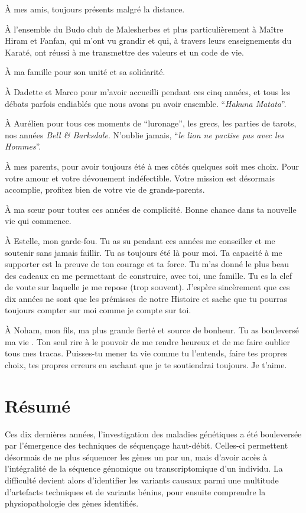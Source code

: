 \documentclass[12pt,a4paper,twoside]{ugathesis}
\theoremstyle{definition}
\theoremstyle{definition}
\theoremstyle{definition}
\theoremstyle{remark}
\begin{document}
À mes amis, toujours présents malgré la distance.

À l'ensemble du Budo club de Malesherbes et plus particulièrement à
Maître Hiram et Fanfan, qui m'ont vu grandir et qui, à travers leurs
enseignements du Karaté, ont réussi à me transmettre des valeurs et un
code de vie.

À ma famille pour son unité et sa solidarité.

À Dadette et Marco pour m'avoir accueilli pendant ces cinq années, et
tous les débats parfois endiablés que nous avons pu avoir ensemble.
``\emph{Hakuna Matata}''.

À Aurélien pour tous ces moments de ``luronage'', les grecs, les parties
de tarots, nos années \emph{Bell \& Barksdale}. N'oublie jamais,
``\emph{le lion ne pactise pas avec les Hommes}''.

À mes parents, pour avoir toujours été à mes côtés quelques soit mes
choix. Pour votre amour et votre dévouement indéfectible. Votre mission
est désormais accomplie, profitez bien de votre vie de grands-parents.

À ma sœur pour toutes ces années de complicité. Bonne chance dans ta
nouvelle vie qui commence.

À Estelle, mon garde-fou. Tu as su pendant ces années me conseiller et
me soutenir sans jamais faillir. Tu as toujours été là pour moi. Ta
capacité à me supporter est la preuve de ton courage et ta force. Tu
m'as donné le plus beau des cadeaux en me permettant de construire, avec
toi, une famille. Tu es la clef de voute sur laquelle je me repose (trop
souvent). J'espère sincèrement que ces dix années ne sont que les
prémisses de notre Histoire et sache que tu pourras toujours compter sur
moi comme je compte sur toi.

À Noham, mon fils, ma plus grande fierté et source de bonheur. Tu as
bouleversé ma vie . Ton seul rire à le pouvoir de me rendre heureux et
de me faire oublier tous mes tracas. Puisses-tu mener ta vie comme tu
l'entends, faire tes propres choix, tes propres erreurs en sachant que
je te soutiendrai toujours. Je t'aime.

\chapter*{Résumé}\label{resume}

\newpage

Ces dix dernières années, l'investigation des maladies génétiques a été
bouleversée par l'émergence des techniques de séquençage haut-débit.
Celles-ci permettent désormais de ne plus séquencer les gènes un par un,
mais d'avoir accès à l'intégralité de la séquence génomique ou
transcriptomique d'un individu. La difficulté devient alors d'identifier
les variants causaux parmi une multitude d'artefacts techniques et de
variants bénins, pour ensuite comprendre la physiopathologie des gènes
identifiés.
\end{document}
